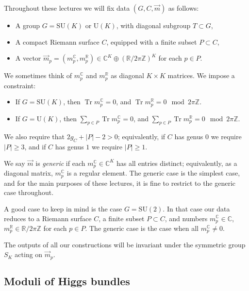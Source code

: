 \documentclass[12pt,letterpaper,reqno]{article}
\numberwithin{equation}{section}
\newcommand{\R}{\ensuremath{\mathbb R}}
\newcommand{\C}{\ensuremath{\mathbb C}}
\newcommand{\Z}{\ensuremath{\mathbb Z}}
\newcommand{\abs}[1]{\lvert#1\rvert}
\newcommand{\ti}[1]{\textit{#1}}
\DeclareMathOperator{\Tr}{Tr}
\newcommand{\SU}{\mathrm{SU}}
\newcommand{\U}{\mathrm{U}}
\newcommand{\insfig}[2]{

\medskip
\noindent
\begin{minipage}{\linewidth}

\makebox[\linewidth]{\texttt{[image: figures/\#1-crop.pdf]}}

\end{minipage}
\medskip

}
\newcommand{\fixme}[1]{{\color{orange}{[#1]}}}
\begin{document}
Throughout these lectures we will fix data $(G,C,\vec m)$ as follows:
\begin{itemize}
  \item A group $G = \SU(K)$ or $\U(K)$, with diagonal subgroup $T \subset G$,
  \item A compact Riemann surface $C$, equipped with a finite subset $P \subset C$,
  \item A vector $\vec{m}_p = (m^\C_p, m^\R_p) \in \C^K \oplus (\R / 2 \pi \Z)^K$ for each $p \in P$.
\end{itemize}
We sometimes think of $m_p^\C$ and $m_p^\R$ as diagonal
$K \times K$ matrices. We impose a constraint:
\begin{itemize}
\item If $G = \SU(K)$, then
$\Tr m_p^\C = 0$, and $\Tr m_p^\R = 0 \mod 2 \pi \Z$.
\item If $G = \U(K)$, then 
$\sum_{p \in P} \Tr m_p^\C = 0$, and
$\sum_{p \in P} \Tr m_p^\R = 0 \mod 2 \pi \Z$.
\end{itemize}
We also require that $2g_C + \abs{P} - 2 > 0$; equivalently, 
if $C$ has genus $0$ we require $\abs{P} \ge 3$, 
and if $C$ has genus $1$ we require $\abs{P} \ge 1$.
\insfig{higgs-metric-1}{0.8}

\begin{defn}
We say $\vec{m}$ is \ti{generic} if each $m^\C_p \in \C^K$
has all entries distinct; equivalently, as a diagonal
matrix, $m^\C_p$ is a regular element.
The generic case is the simplest
case, and for the main purposes of these lectures,
it is fine to restrict to the generic case throughout.
\end{defn}

\begin{example}[The case of $G = \SU(2)$]
A good case to keep in mind is the case $G = \SU(2)$. In that case our data reduces to a Riemann surface $C$, a finite subset $P \subset C$,
and numbers $m^\C_p \in \C$, $m^\R_p \in \R / 2 \pi \Z$ for each $p \in P$. The generic case is the case when all $m^\C_p \neq 0$.
\end{example}

\begin{remark} The outputs of all our constructions will 
be invariant under the symmetric group $S_K$ acting on $\vec m_p$.
\end{remark}


\subsection{Moduli of Higgs bundles}
\end{document}
